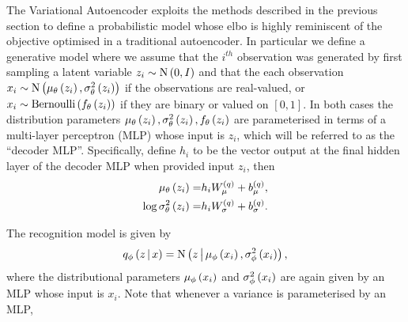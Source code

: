 \documentclass[../report.tex]{subfiles}
\begin{document}
The Variational Autoencoder exploits the methods described in the previous section to define a probabilistic model whose elbo is highly reminiscent of the objective optimised in a traditional autoencoder. In particular we define a generative model where we assume that the $i^{th}$ observation was generated by first sampling a latent variable $z_i \sim \textrm{N} \left( 0, I\right)$ and that the each observation $x_i \sim \textrm{N} \left( \mu_\theta \left( z_i\right), \sigma^2_\theta \left( z_i\right)\right)$ if the observations are real-valued, or $x_i \sim \textrm{Bernoulli} \left( f_\theta \left( z_i\right)\right)$ if they are binary or valued on $[0, 1]$. In both cases the distribution parameters $\mu_\theta \left( z_i\right), \sigma^2_\theta \left( z_i\right), f_\theta \left( z_i\right)$ are parameterised in terms of a multi-layer perceptron (MLP) whose input is $z_i$, which will be referred to as the ``decoder MLP''. Specifically, define $h_i$ to be the vector output at the final hidden layer of the decoder MLP when provided input $z_i$, then
\begin{align}
  \mu_\theta \left( z_i\right) =& h_i W_\mu^{(q)} + b_\mu^{(q)}, \\
  \log \sigma^2_\theta \left( z_i\right) =& h_i W_\sigma^{(q)} + b_\sigma^{(q)}.
\end{align}





The recognition model is given by
\begin{equation}
  q_\phi \left(z \, \middle\vert \, x \right) = \textrm{N} \left(z \, \middle\vert \, \mu_\phi \left( x_i\right), \sigma_\phi^2 \left( x_i\right) \right),
\end{equation}
where the distributional parameters $\mu_\phi \left( x_i\right)$ and $\sigma_\phi^2 \left( x_i\right)$ are again given by an MLP whose input is $x_i$. Note that whenever a variance is parameterised by an MLP, 
\end{document}

